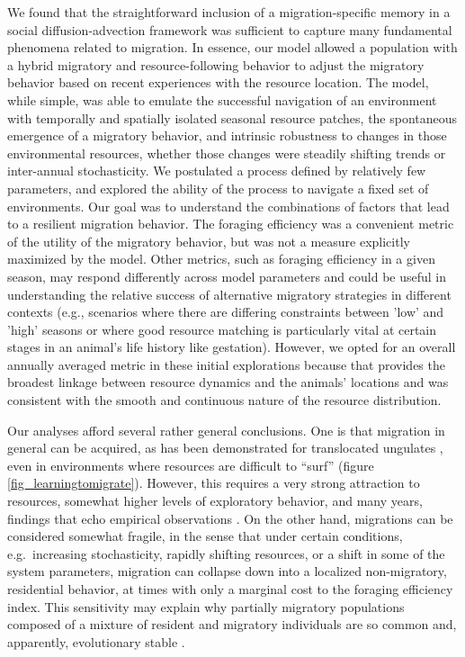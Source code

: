 \documentclass[utf8]{frontiersSCNS} %
\begin{document}
We found that the straightforward inclusion of a migration-specific memory in a social diffusion-advection framework was sufficient to capture many fundamental phenomena related to migration. In essence, our model allowed a population with a hybrid migratory and resource-following behavior to adjust the migratory behavior based on recent experiences with the resource location. The model, while simple, was able to emulate the successful navigation of an environment with temporally and spatially isolated seasonal resource patches, the spontaneous emergence of a migratory behavior, and intrinsic robustness to changes in those environmental resources, whether those changes were steadily shifting trends or inter-annual stochasticity. We postulated a process defined by relatively few parameters, and explored the ability of the process to navigate a fixed set of environments. Our goal was to understand the combinations of factors that lead to a resilient migration behavior. The foraging efficiency was a convenient metric of the utility of the migratory behavior, but was not a measure explicitly maximized by the model. Other metrics, such as foraging efficiency in a given season, may respond differently across model parameters and could be useful in understanding the relative success of alternative migratory strategies in different contexts (e.g., scenarios where there are differing constraints between 'low' and 'high' seasons or where good resource matching is particularly vital at certain stages in an animal's life history like gestation).  However, we opted for an overall annually averaged metric in these initial explorations because that provides the broadest linkage between resource dynamics and the animals' locations and was consistent with the smooth and continuous nature of the resource distribution.

Our analyses afford several rather general conclusions. One is that migration in general can be acquired, as has been demonstrated for translocated ungulates \citep{Jesmer2018}, even in environments where resources are difficult to ``surf'' (figure \ref{fig_learningtomigrate}). However, this requires a very strong attraction to resources, somewhat higher levels of exploratory behavior, and many years, findings that echo empirical observations \citep{Jesmer2018}. On the other hand, migrations can be considered somewhat fragile, in the sense that under certain conditions, e.g.~increasing stochasticity, rapidly shifting resources, or a shift in some of the system parameters, migration can collapse down into a localized non-migratory, residential behavior, at times with only a marginal cost to the foraging efficiency index. This sensitivity may explain why partially migratory populations composed of a mixture of resident and migratory individuals are so common and, apparently, evolutionary stable \citep{Berthold1999, Chapman2011}.
\end{document}
